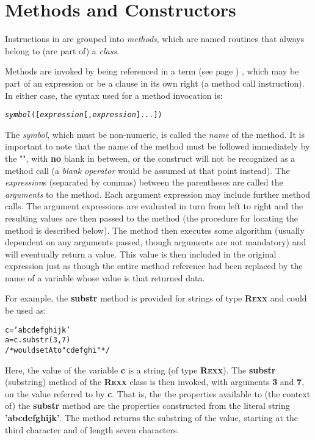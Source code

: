 \chapter{Methods and Constructors}\label{refmethcon}
\index{,}
 
Instructions in \nr{} are grouped into \emph{methods}, which are
named routines that always belong to (are part of) a \emph{class}.
 
Methods are invoked by being referenced in a  term (see page \pageref{refterms}) ,
which may be part of an expression or be a clause in its own right (a
method call instruction).
In either case, the syntax used for a method invocation is:
\begin{shaded}
\begin{alltt}
\emph{symbol}([\emph{expression}[,\emph{expression}]...])
\end{alltt}
\end{shaded}
 The \emph{symbol}, which must be non-numeric, is called the
\emph{name} of the method.
It is important to note that the name of the method must be followed
immediately by the "\keyword{(}", with \textbf{no} blank in
between, or the construct will not be recognized as a method call
(a \emph{blank operator} would be assumed at that point instead).
 The \emph{expression}s (separated by commas) between the
parentheses are called the \emph{arguments} to the method.
Each argument expression may include further method calls.
 The argument expressions are evaluated in turn from left to right
and the resulting values are then passed to the method (the procedure
for locating the method is described below).
The method then executes some algorithm (usually dependent on any
arguments passed, though arguments are not mandatory) and will
eventually return a value.
This value is then included in the original expression just as though
the entire method reference had been replaced by the name of a variable
whose value is that returned data.
 
For example, the \textbf{substr} method is provided for strings of
type \textbf{R\textsc{exx}} and could be used as:
\begin{alltt}
c='abcdefghijk'
a=c.substr(3,7)
/* would set A to "cdefghi" */
\end{alltt}
Here, the value of the variable \textbf{c} is a string (of
type \textbf{R\textsc{exx}}).
The \textbf{substr} (substring) method of the \textbf{R\textsc{exx}} class is
then invoked, with arguments \textbf{3} and \textbf{7}, on the value
referred to by \textbf{c}.
That is, the the properties available to (the context of)
the \textbf{substr} method are the properties constructed from the
literal string \textbf{'abcdefghijk'}.
The method returns the substring of the value, starting at the third
character and of length seven characters.
 
